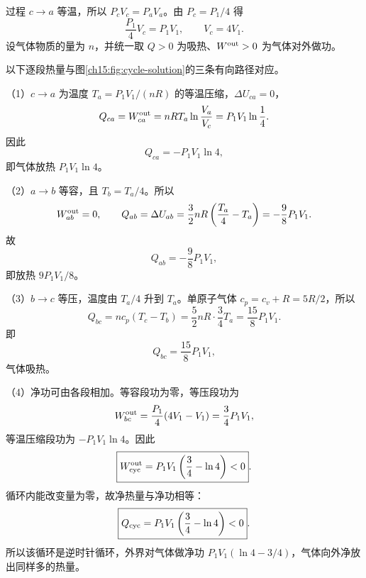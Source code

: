 {\par\nopagebreak[4]\begin{xesolution}
过程 $c\to a$ 等温，所以 $P_cV_c=P_aV_a$。由 $P_c=P_1/4$ 得
\begin{equation*}
  \frac{P_1}{4}V_c=P_1V_1,
  \qquad
  \boxed{V_c=4V_1}.
\end{equation*}
设气体物质的量为 $n$，并统一取 $Q>0$ 为吸热、$W^{\rm out}>0$ 为气体对外做功。

\par\noindent\begin{minipage}{\linewidth}
\cycleExampleDiagram
{}\label{ch15:fig:cycle-solution}
\end{minipage}\par\medskip
以下逐段热量与图\ref{ch15:fig:cycle-solution}的三条有向路径对应。

（1）$c\to a$ 为温度 $T_a=P_1V_1/(nR)$ 的等温压缩，$\Delta U_{ca}=0$，
\begin{equation*}
  Q_{ca}=W^{\rm out}_{ca}
  =nRT_a\ln\frac{V_a}{V_c}
  =P_1V_1\ln\frac14.
\end{equation*}
因此
\begin{equation}
  \boxed{Q_{ca}=-P_1V_1\ln4},
\end{equation}
即气体放热 $P_1V_1\ln4$。

（2）$a\to b$ 等容，且 $T_b=T_a/4$。所以
\begin{equation*}
  W^{\rm out}_{ab}=0,
  \qquad
  Q_{ab}=\Delta U_{ab}
  =\frac32nR\left(\frac{T_a}{4}-T_a\right)
  =-\frac98P_1V_1.
\end{equation*}
故
\begin{equation}
  \boxed{Q_{ab}=-\frac98P_1V_1},
\end{equation}
即放热 $9P_1V_1/8$。

（3）$b\to c$ 等压，温度由 $T_a/4$ 升到 $T_a$。单原子气体 $c_p=c_v+R=5R/2$，所以
\begin{equation*}
  Q_{bc}=nc_p(T_c-T_b)
  =\frac52nR\cdot\frac34T_a
  =\frac{15}{8}P_1V_1.
\end{equation*}
即
\begin{equation}
  \boxed{Q_{bc}=\frac{15}{8}P_1V_1},
\end{equation}
气体吸热。

（4）净功可由各段相加。等容段功为零，等压段功为
\begin{equation*}
  W^{\rm out}_{bc}=\frac{P_1}{4}(4V_1-V_1)=\frac34P_1V_1,
\end{equation*}
等温压缩段功为 $-P_1V_1\ln4$。因此
\begin{equation}
  \boxed{W^{\rm out}_{\rm cyc}=P_1V_1\left(\frac34-\ln4\right)<0}.
\end{equation}
循环内能改变量为零，故净热量与净功相等：
\begin{equation}
  \boxed{Q_{\rm cyc}=P_1V_1\left(\frac34-\ln4\right)<0}.
\end{equation}
所以该循环是逆时针循环，外界对气体做净功
$P_1V_1(\ln4-3/4)$，气体向外净放出同样多的热量。
\end{xesolution}


}
